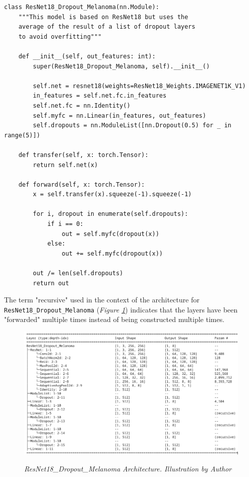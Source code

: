 \begin{Verbatim}[fontsize=\scriptsize]
class ResNet18_Dropout_Melanoma(nn.Module):
    """This model is based on ResNet18 but uses the
    average of the result of a list of dropout layers
    to avoid overfitting"""

    def __init__(self, out_features: int):
        super(ResNet18_Dropout_Melanoma, self).__init__()

        self.net = resnet18(weights=ResNet18_Weights.IMAGENET1K_V1)
        in_features = self.net.fc.in_features
        self.net.fc = nn.Identity()
        self.myfc = nn.Linear(in_features, out_features)
        self.dropouts = nn.ModuleList([nn.Dropout(0.5) for _ in range(5)])

    def transfer(self, x: torch.Tensor):
        return self.net(x)

    def forward(self, x: torch.Tensor):
        x = self.transfer(x).squeeze(-1).squeeze(-1)

        for i, dropout in enumerate(self.dropouts):
            if i == 0:
                out = self.myfc(dropout(x))
            else:
                out += self.myfc(dropout(x))

        out /= len(self.dropouts)
        return out
\end{Verbatim}

The term "recursive" used in the context of the architecture for
\texttt{ResNet18\_Dropout\_Melanoma} (\textit{Figure
\ref{fig:resnet-18-dropout-melanoma-arch}}) indicates that the layers have been
"forwarded" multiple times instead of being constructed multiple times.

\begin{figure}[H]
  \centering
  \includegraphics[width=\textwidth]{imatges/methodological_contribution/ResNet18_Dropout_Melanoma.png}
  \caption[ResNet18\_Dropout\_Melanoma
  Architecture]{\textit{ResNet18\_Dropout\_Melanoma Architecture.
  Illustration by Author}}
  {\label{fig:resnet-18-dropout-melanoma-arch}}
\end{figure}


